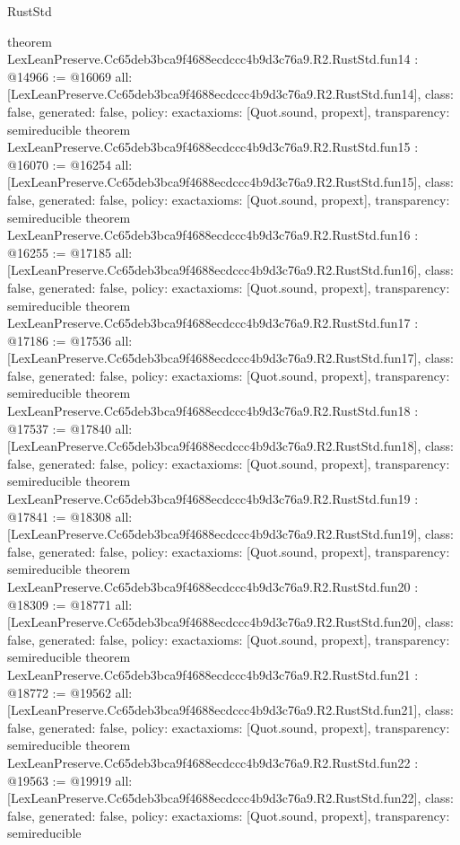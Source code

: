 \begin{lexlean}{RustStd}
\begin{coremodule}
{}
theorem LexLeanPreserve.Cc65deb3bca9f4688ecdccc4b9d3c76a9.R2.RustStd.fun14 : @14966 := @16069 {
  all: [LexLeanPreserve.Cc65deb3bca9f4688ecdccc4b9d3c76a9.R2.RustStd.fun14],
  class: false,
  generated: false,
  policy: exact{axioms: [Quot.sound, propext]},
  transparency: semireducible
}
theorem LexLeanPreserve.Cc65deb3bca9f4688ecdccc4b9d3c76a9.R2.RustStd.fun15 : @16070 := @16254 {
  all: [LexLeanPreserve.Cc65deb3bca9f4688ecdccc4b9d3c76a9.R2.RustStd.fun15],
  class: false,
  generated: false,
  policy: exact{axioms: [Quot.sound, propext]},
  transparency: semireducible
}
theorem LexLeanPreserve.Cc65deb3bca9f4688ecdccc4b9d3c76a9.R2.RustStd.fun16 : @16255 := @17185 {
  all: [LexLeanPreserve.Cc65deb3bca9f4688ecdccc4b9d3c76a9.R2.RustStd.fun16],
  class: false,
  generated: false,
  policy: exact{axioms: [Quot.sound, propext]},
  transparency: semireducible
}
theorem LexLeanPreserve.Cc65deb3bca9f4688ecdccc4b9d3c76a9.R2.RustStd.fun17 : @17186 := @17536 {
  all: [LexLeanPreserve.Cc65deb3bca9f4688ecdccc4b9d3c76a9.R2.RustStd.fun17],
  class: false,
  generated: false,
  policy: exact{axioms: [Quot.sound, propext]},
  transparency: semireducible
}
theorem LexLeanPreserve.Cc65deb3bca9f4688ecdccc4b9d3c76a9.R2.RustStd.fun18 : @17537 := @17840 {
  all: [LexLeanPreserve.Cc65deb3bca9f4688ecdccc4b9d3c76a9.R2.RustStd.fun18],
  class: false,
  generated: false,
  policy: exact{axioms: [Quot.sound, propext]},
  transparency: semireducible
}
theorem LexLeanPreserve.Cc65deb3bca9f4688ecdccc4b9d3c76a9.R2.RustStd.fun19 : @17841 := @18308 {
  all: [LexLeanPreserve.Cc65deb3bca9f4688ecdccc4b9d3c76a9.R2.RustStd.fun19],
  class: false,
  generated: false,
  policy: exact{axioms: [Quot.sound, propext]},
  transparency: semireducible
}
theorem LexLeanPreserve.Cc65deb3bca9f4688ecdccc4b9d3c76a9.R2.RustStd.fun20 : @18309 := @18771 {
  all: [LexLeanPreserve.Cc65deb3bca9f4688ecdccc4b9d3c76a9.R2.RustStd.fun20],
  class: false,
  generated: false,
  policy: exact{axioms: [Quot.sound, propext]},
  transparency: semireducible
}
theorem LexLeanPreserve.Cc65deb3bca9f4688ecdccc4b9d3c76a9.R2.RustStd.fun21 : @18772 := @19562 {
  all: [LexLeanPreserve.Cc65deb3bca9f4688ecdccc4b9d3c76a9.R2.RustStd.fun21],
  class: false,
  generated: false,
  policy: exact{axioms: [Quot.sound, propext]},
  transparency: semireducible
}
theorem LexLeanPreserve.Cc65deb3bca9f4688ecdccc4b9d3c76a9.R2.RustStd.fun22 : @19563 := @19919 {
  all: [LexLeanPreserve.Cc65deb3bca9f4688ecdccc4b9d3c76a9.R2.RustStd.fun22],
  class: false,
  generated: false,
  policy: exact{axioms: [Quot.sound, propext]},
  transparency: semireducible
}
\end{coremodule}
\end{lexlean}
